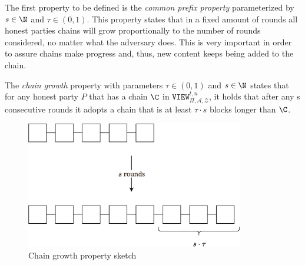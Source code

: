 \documentclass[..]{subfiles}
\begin{document}
The first property to be defined is the \textit{common prefix property} parameterized by $s \in \N$ and $\tau \in (0, 1)$. This property states that in a fixed amount of rounds all honest parties chains will grow proportionally to the number of rounds considered, no matter what the adversary does. This is very important in order to assure chains make progress and, thus, new content keeps being added to the chain.

\begin{definition}
	\normalfont
	The \textit{chain growth} property with parameters $\tau \in (0, 1)$ and $s \in \N$ states that for any honest party $P$ that has a chain $\C$ in $\texttt{VIEW}_{\Pi, \mathcal{A}, \mathcal{Z}}^{t, n}$, it holds that after any s consecutive rounds it adopts a chain that is at least $\tau \cdot s$ blocks longer than $\C$.
\end{definition}

\begin{figure}[h]
	\begin{center}
		\includegraphics[width=0.85\textwidth]{figures/chain_growth.png}
	\end{center}
	\caption{Chain growth property sketch}
	\label{fig:cg}
\end{figure}
\end{document}
